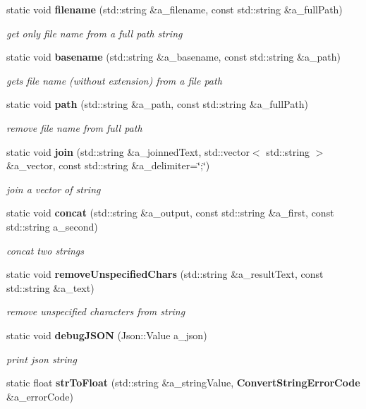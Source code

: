 \begin{DoxyCompactItemize}
static void {\bf filename} (std\+::string \&a\+\_\+filename, const std\+::string \&a\+\_\+full\+Path)
\begin{DoxyCompactList}\small\item\em get only file name from a full path string \end{DoxyCompactList}\item 
static void {\bf basename} (std\+::string \&a\+\_\+basename, const std\+::string \&a\+\_\+path)
\begin{DoxyCompactList}\small\item\em gets file name (without extension) from a file path \end{DoxyCompactList}\item 
static void {\bf path} (std\+::string \&a\+\_\+path, const std\+::string \&a\+\_\+full\+Path)
\begin{DoxyCompactList}\small\item\em remove file name from full path \end{DoxyCompactList}\item 
static void {\bf join} (std\+::string \&a\+\_\+joinned\+Text, std\+::vector$<$ std\+::string $>$ \&a\+\_\+vector, const std\+::string \&a\+\_\+delimiter=\char`\"{};\char`\"{})
\begin{DoxyCompactList}\small\item\em join a vector of string \end{DoxyCompactList}\item 
static void {\bf concat} (std\+::string \&a\+\_\+output, const std\+::string \&a\+\_\+first, const std\+::string a\+\_\+second)
\begin{DoxyCompactList}\small\item\em concat two strings \end{DoxyCompactList}\item 
static void {\bf remove\+Unspecified\+Chars} (std\+::string \&a\+\_\+result\+Text, const std\+::string \&a\+\_\+text)
\begin{DoxyCompactList}\small\item\em remove unspecified characters from string \end{DoxyCompactList}\item 
static void {\bf debug\+J\+S\+ON} (Json\+::\+Value a\+\_\+json)
\begin{DoxyCompactList}\small\item\em print json string \end{DoxyCompactList}\item 
static float {\bf str\+To\+Float} (std\+::string \&a\+\_\+string\+Value, {\bf Convert\+String\+Error\+Code} \&a\+\_\+error\+Code)

\end{DoxyCompactItemize}

